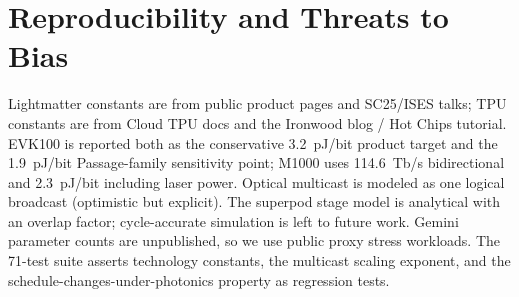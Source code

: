 \documentclass[10pt]{article}
\begin{document}
\section*{Reproducibility and Threats to Bias}
Lightmatter constants are from public product pages and SC25/ISES
talks; TPU constants are from Cloud TPU docs and the Ironwood
blog / Hot Chips tutorial. EVK100 is reported both as the conservative
3.2~pJ/bit product target and the 1.9~pJ/bit Passage-family
sensitivity point; M1000 uses 114.6~Tb/s bidirectional and 2.3~pJ/bit
including laser power. Optical multicast is modeled as one logical
broadcast (optimistic but explicit). The superpod stage model is
analytical with an overlap factor; cycle-accurate simulation is left
to future work. Gemini parameter counts are unpublished, so we use
public proxy stress workloads. The 71-test suite asserts technology
constants, the multicast scaling exponent, and the
schedule-changes-under-photonics property as regression tests.
\end{document}
